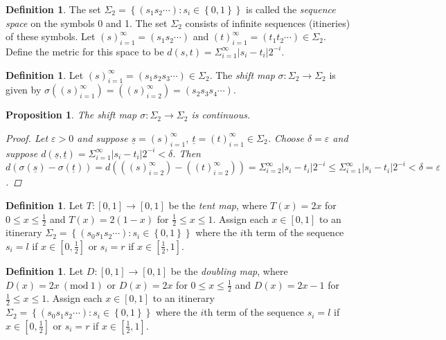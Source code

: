 \documentclass[11pt,a4paper,oneside]{memoir}
\theoremstyle{plain}
\newtheorem{prop}[thm]{Proposition}
\theoremstyle{definition}
\newtheorem{defn}[thm]{Definition}
\newcommand{\mmod}[1]{\ (\mathrm{mod}\ #1)}
\begin{document}
\begin{defn}
    The set $\Sigma_2 = \left\lbrace (s_1s_2\cdots): s_i \in \left\lbrace 0, 1 \right\rbrace \right\rbrace$ is called the \emph{sequence space} on the symbols 0 and 1. The set $\Sigma_2$ consists of infinite sequences (itineries) of these symbols. Let $(s)_{i=1}^{\infty} = (s_1s_2\cdots)$ and $(t)_{i=1}^{\infty} = (t_1t_2\cdots) \in \Sigma_2$. Define the metric for this space to be $d(s, t) = \Sigma_{i=1}^{\infty}|s_i - t_i|2^{-i}$.
\end{defn}

\begin{defn}
    Let $(s)_{i=1}^{\infty} = (s_1s_2s_3\cdots) \in \Sigma_2$. The \emph{shift map} $\sigma: \Sigma_2 \to \Sigma_2$ is given by $\sigma \left((s)_{i=1}^{\infty}\right) = \left((s)_{i=2}^{\infty}\right) = (s_2s_3s_4\cdots)$.
\end{defn}

\begin{prop}
    The shift map $\sigma: \Sigma_2 \to \Sigma_2$ is continuous.
    \begin{proof}
        Let $\varepsilon > 0$ and suppose $\underline{s} = (s)_{i=1}^{\infty}, \ \underline{t} = (t)_{i=1}^{\infty} \in \Sigma_2$. Choose $\delta = \varepsilon$ and suppose $d(\underline{s}, \underline{t}) = \Sigma_{i=1}^{\infty}|s_i - t_i|2^{-i} < \delta$. Then $d\left( \sigma\left(\underline{s}\right) - \sigma\left(\underline{t}\right) \right) = d\left(\left((s)_{i=2}^{\infty}\right) - \left((t)_{i=2}^{\infty}\right)\right) = \Sigma_{i=2}^{\infty}|s_i - t_i|2^{-i} \leq \Sigma_{i=1}^{\infty}|s_i - t_i|2^{-i} < \delta = \varepsilon$.
    \end{proof}
\end{prop}

\begin{defn}
    Let $T: [0, 1] \to [0, 1]$ be the \emph{tent map}, where $T(x) = 2x$ for $0 \leq x \leq \frac{1}{2}$ and $T(x) = 2(1-x)$ for $\frac{1}{2} \leq x \leq 1$.  Assign each $x \in [0, 1]$ to an itinerary $\Sigma_2 = \left\lbrace(s_0s_1s_2\cdots) : s_i \in \left\lbrace0, 1\right\rbrace \right\rbrace$ where the $i$th term of the sequence $s_i = l$ if $x \in \left[0, \frac{1}{2} \right]$ or $s_i = r$ if $x \in \left[\frac{1}{2}, 1 \right]$.
\end{defn}

\begin{defn}
    Let $D: [0,1] \to [0,1]$ be the \emph{doubling map}, where $D(x) = 2x \mmod 1$ or $D(x) = 2x$ for $0 \leq x \leq \frac{1}{2}$ and $D(x) = 2x - 1$ for $\frac{1}{2} \leq x \leq 1$. Assign each $x \in [0, 1]$ to an itinerary $\Sigma_2 = \left\lbrace(s_0s_1s_2\cdots) : s_i \in \left\lbrace0, 1\right\rbrace \right\rbrace$ where the $i$th term of the sequence $s_i = l$ if $x \in \left[0, \frac{1}{2} \right]$ or $s_i = r$ if $x \in \left[\frac{1}{2}, 1 \right]$.
\end{defn}
\end{document}
